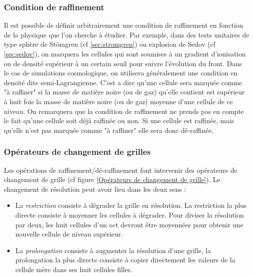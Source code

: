 
\subsubsection{Condition de raffinement}
\label{sec:condraf}

Il est possible de définir arbitrairement une condition de raffinement en fonction de la physique que l'on cherche à étudier.
Par exemple, dans des tests unitaires de type sphère de Stömgren (cf \ref{sec:stromgren}) ou explosion de Sedov (cf \ref{sec:sedov}), on marquera les cellules qui sont soumises à un gradient d'ionisation ou de densité supérieur à un certain seuil pour suivre l'évolution du front.
Dans le cas de simulations cosmologique, on utilisera généralement une condition en densité dite semi-Lagrangienne.
C'est a dire qu'une cellule sera marquée comme "à raffiner" si la masse de matière noire (ou de gaz) qu'elle contient est supérieur à huit fois la masse de matière noire (ou de gaz) moyenne d'une cellule de ce niveau.
On remarquera que la condition de raffinement ne prends pas en compte le fait qu'une cellule soit déjà raffinée ou non.
Si une cellule est raffinée, mais qu'elle n'est pas marquée comme "à raffiner" elle sera donc dé-raffinée.


\subsubsection{Opérateurs de changement de grilles} 
\label{sec_gridchange}

Les opérations de raffinement/dé-raffinement font intervenir des opérateurs de changement de grille (cf figure \ref{Opérateurs de changement de grille}).
Le changement de résolution peut avoir lieu dans les deux sens :

\begin{itemize}
\item La \emph{restriction} consiste à dégrader la grille en résolution. 
La restriction la plus directe consiste à moyenner les cellules à dégrader. 
Pour diviser la résolution par deux, les huit cellules d'un oct devront être moyennées pour obtenir une nouvelle cellule de niveau supérieur.

\item La \emph{prolongation} consiste à augmenter la résolution d'une grille, la prolongation la plus directe consiste à copier directement les valeurs de la cellule mère dans ses huit cellules filles.
\end{itemize}

